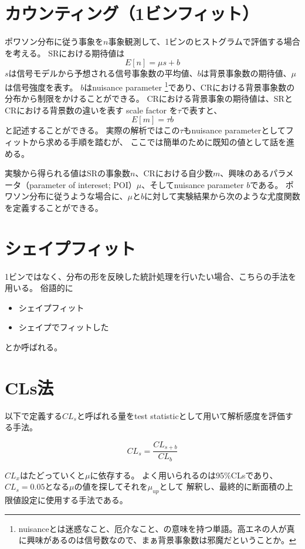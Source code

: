\section{カウンティング（1ビンフィット）}
ポワソン分布に従う事象を$n$事象観測して、1ビンのヒストグラムで評価する場合を考える。
SRにおける期待値は
\begin{equation}
E[n] = \mu s + b
\end{equation}
$s$は信号モデルから予想される信号事象数の平均値、$b$は背景事象数の期待値、$\mu$は信号強度を表す。
$b$はnuisance parameter \footnote{nuisanceとは迷惑なこと、厄介なこと、の意味を持つ単語。高エネの人が真に興味があるのは信号数なので、まぁ背景事象数は邪魔だということか。}であり、CRにおける背景事象数の分布から制限をかけることができる。
CRにおける背景事象の期待値は、SRとCRにおける背景数の違いを表す scale factor を$\tau$で表すと、
\begin{equation}
E[m] = \tau b
\end{equation}
と記述することができる。
実際の解析ではこの$\tau$もnuisance parameterとしてフィットから求める手順を踏むが、
ここでは簡単のために既知の値として話を進める。

実験から得られる値はSRの事象数$n$、CRにおける自少数$m$、興味のあるパラメータ（parameter of intereset; POI）$\mu$、そしてnuisance parameter $b$である。
ポワソン分布に従うような場合に、$\mu$と$b$に対して実験結果から次のような尤度関数を定義することができる。


\section{シェイプフィット}
1ビンではなく、分布の形を反映した統計処理を行いたい場合、こちらの手法を用いる。
俗語的に
\begin{itemize}
  \item シェイプフィット
  \item シェイプでフィットした
\end{itemize}
とか呼ばれる。

\section{CLs法}
以下で定義する$CL_s$と呼ばれる量をtest statisticとして用いて解析感度を評価する手法。

\begin{equation}
CL_s = \frac{CL_{s+b}}{CL_b}
\end{equation}

$CL_{x}$はたどっていくと$\mu$に依存する。
よく用いられるのは95$\%$CLsであり、$CL_s=0.05$となる$\mu$の値を探してそれを$\mu_{up}$として
解釈し、最終的に断面積の上限値設定に使用する手法である。


